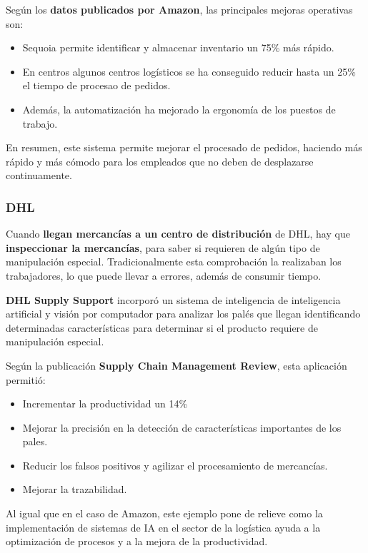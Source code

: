 Según los \textbf{datos publicados por Amazon}, las principales mejoras operativas son: 

\begin{itemize}
	\item Sequoia permite identificar y almacenar inventario un 75\% más rápido.
	\item En centros algunos centros logísticos se ha conseguido reducir hasta un 25\% el tiempo de procesao de pedidos.
	\item Además, la automatización ha mejorado la ergonomía de los puestos de trabajo. 
\end{itemize}

En resumen, este sistema permite mejorar el procesado de pedidos, haciendo más rápido y más cómodo para los empleados que no deben de desplazarse continuamente.

\subsubsection{DHL}
Cuando \textbf{llegan mercancías a un centro de distribución} de DHL, hay que \textbf{inspeccionar la mercancías}, para saber si requieren de algún tipo de manipulación especial. Tradicionalmente esta comprobación la realizaban los trabajadores, lo que puede llevar a errores, además de consumir tiempo.

\textbf{DHL Supply Support} incorporó un sistema de inteligencia de inteligencia artificial y visión por computador para analizar los palés que llegan identificando determinadas características para determinar si el producto requiere de manipulación especial.

Según la publicación \textbf{Supply Chain Management Review}, esta aplicación permitió:

\begin{itemize}
	\item Incrementar la productividad un 14\%
	\item Mejorar la precisión en la detección de características importantes de los pales.
	\item Reducir los falsos positivos y agilizar el procesamiento de mercancías.
	\item Mejorar la trazabilidad.
\end{itemize}

Al igual que en el caso de Amazon, este ejemplo pone de relieve como la implementación de sistemas de IA en el sector de la logística ayuda a la optimización de procesos y a la mejora de la productividad.

